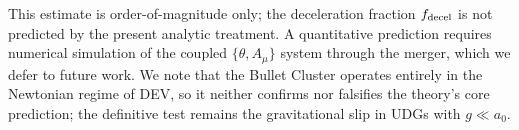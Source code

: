 \documentclass[aps,prd,twocolumn,showpacs,superscriptaddress]{revtex4-2}
\newcommand{\aO}{a_0}
\begin{document}
This estimate is order-of-magnitude only; the deceleration
fraction $f_{\rm decel}$ is not predicted by the present
analytic treatment. A quantitative prediction requires
numerical simulation of the coupled $\{\theta, A_\mu\}$
system through the merger, which we defer to future work.
We note that the Bullet Cluster operates entirely in the
Newtonian regime of DEV, so it neither confirms nor
falsifies the theory's core prediction; the definitive test
remains the gravitational slip in UDGs with $g \ll \aO$.



\end{document}
